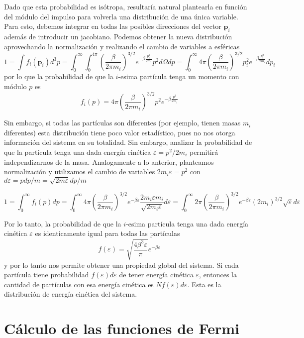 Dado que esta probabilidad es isótropa, resultaría natural plantearla en función del módulo del impulso para volverla una distribución de una única variable.
Para esto, debemos integrar en todas las posibles direcciones del vector $\mathbf{p}_i$ además de introducir un jacobiano.
Podemos obtener la nueva distribución aprovechando la normalización y realizando el cambio de variables a esféricas
\[1 = \int f_i(\mathbf{p}_i) d^3p = \int_0^\infty\int_0^{4\pi}\left(\frac{\beta}{2\pi m_i} \right)^{3/2} e^{-\beta\frac{p_i^2}{2m_i}} p^2d\Omega dp
= \int_0^\infty 4\pi\left(\frac{\beta}{2\pi m_i} \right)^{3/2} p_i^2 e^{-\beta\frac{p_i^2}{2m_i}} dp_i\]
por lo que la probabilidad de que la $i$-esima partícula tenga un momento con módulo $p$ es
\[ f_i(p) = 4\pi\left(\frac{\beta}{2\pi m_i} \right)^{3/2} p^2 e^{-\beta\frac{p^2}{2m_i}} \]

Sin embargo, si todas las partículas son diferentes (por ejemplo, tienen masas $m_i$ diferentes) esta distribución tiene poco valor estadístico, pues no nos otorga información
del sistema en su totalidad.
Sin embargo, analizar la probabilidad de que la partícula tenga una dada energía cinética $\varepsilon = p^2/2m_i$ permitirá independizarnos de la masa.
Analogamente a lo anterior, planteamos normalización y utilizamos el cambio de variables $2m_i\varepsilon = p^2$ con $d\varepsilon = pdp/m = \sqrt{2m\varepsilon}dp/m$

\[ 1 = \int_0^\infty f_i(p) dp = \int_0^\infty 4\pi\left(\frac{\beta}{2\pi m_i} \right)^{3/2} e^{-\beta\varepsilon} \frac{2m_i\varepsilon m_i}{\sqrt{2m_i\varepsilon}} d\varepsilon
= \int_0^\infty 2\pi\left(\frac{\beta}{2\pi m_i} \right)^{3/2} e^{-\beta\varepsilon} (2m_i)^{3/2}\sqrt{\varepsilon} d\varepsilon \]

Por lo tanto, la probabilidad de que la $i$-esima partícula tenga una dada energía cinética $\varepsilon$ es identicamente igual para todas las partículas
\begin{equation}
 f(\varepsilon) = \sqrt{\frac{4\beta^3\varepsilon}{\pi}}e^{-\beta\varepsilon}
\end{equation}
y por lo tanto nos permite obtener una propiedad global del sistema.
Si cada partícula tiene probabilidad $f(\varepsilon)d\varepsilon$ de tener energía cinética $\varepsilon$, entonces la cantidad de partículas con esa energía cinética es $Nf(\varepsilon)d\varepsilon$.
Esta es la distribución de energía cinética del sistema.

\newpage

\section{Cálculo de las funciones de Fermi}{\label{ap:func_fermi}}

